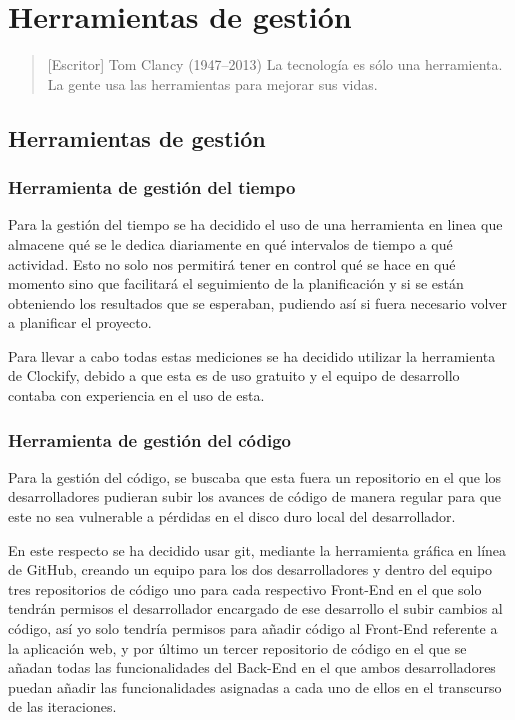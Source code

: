 \chapter{Herramientas de gestión}

\begin{quotation} [Escritor] {Tom Clancy (1947--2013)}
La tecnología es sólo una herramienta. La gente usa las herramientas para mejorar sus vidas.
\end{quotation}

\begin{abstract}
Para el correcto desarrollo de proyectos se han de utilizar herramientas tanto generales que controlen el tiempo que se le dedica al proyecto como específicas en cuanto a lo que respecta a proyectos informáticos, como repositorios de código, veamos entonces qué herramientas hemos usado.
\end{abstract}

\section{Herramientas de gestión}
\subsection{Herramienta de gestión del tiempo}
Para la gestión del tiempo se ha decidido el uso de una herramienta en linea que almacene qué se le dedica diariamente en qué intervalos de tiempo a qué actividad. Esto no solo nos permitirá tener en control qué se hace en qué momento sino que facilitará el seguimiento de la planificación y si se están obteniendo los resultados que se esperaban, pudiendo así si fuera necesario volver a planificar el proyecto. 

Para llevar a cabo todas estas mediciones se ha decidido utilizar la herramienta de Clockify, debido a que esta es de uso gratuito y el equipo de desarrollo contaba con experiencia en el uso de esta.

\subsection{Herramienta de gestión del código}

Para la gestión del código, se buscaba que esta fuera un repositorio en el que los desarrolladores pudieran subir los avances de código de manera regular para que este no sea vulnerable a pérdidas en el disco duro local del desarrollador. 

En este respecto se ha decidido usar git, mediante la  herramienta gráfica en línea de GitHub, creando un equipo para los dos desarrolladores y dentro del equipo tres repositorios de código uno para cada respectivo Front-End en el que solo tendrán permisos el desarrollador encargado de ese desarrollo el subir cambios al código, así yo solo tendría permisos para añadir código al Front-End referente a la aplicación web, y por último un tercer repositorio de código en el que se añadan todas las funcionalidades del Back-End en el que ambos desarrolladores puedan añadir las funcionalidades asignadas a cada uno de ellos en el transcurso de las iteraciones.

